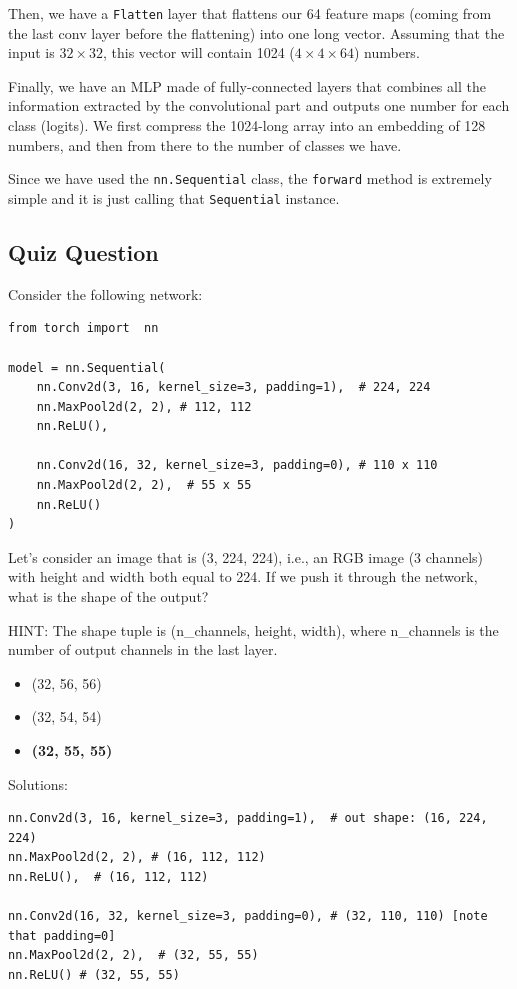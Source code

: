 Then, we have a \lstinline{Flatten} layer that flattens our 64 feature maps (coming from the last conv layer before the flattening) into one long vector. Assuming that the input is \(32 \times 32\), this vector will contain 1024 (\(4 \times 4 \times 64\)) numbers.\newline

Finally, we have an MLP made of fully-connected layers that combines all the information extracted by the convolutional part and outputs one number for each class (logits). We first compress the 1024-long array into an embedding of 128 numbers, and then from there to the number of classes we have.\newline

Since we have used the \lstinline{nn.Sequential} class, the \lstinline{forward} method is extremely simple and it is just calling that \lstinline{Sequential} instance.

\subsection{Quiz Question}

Consider the following network:
\begin{lstlisting}
from torch import  nn

model = nn.Sequential(
    nn.Conv2d(3, 16, kernel_size=3, padding=1),  # 224, 224
    nn.MaxPool2d(2, 2), # 112, 112
    nn.ReLU(),
    
    nn.Conv2d(16, 32, kernel_size=3, padding=0), # 110 x 110
    nn.MaxPool2d(2, 2),  # 55 x 55
    nn.ReLU()
)
\end{lstlisting}
Let's consider an image that is (3, 224, 224), i.e., an RGB image (3 channels) with height and width both equal to 224. If we push it through the network, what is the shape of the output?

HINT: The shape tuple is (n\_channels, height, width), where n\_channels is the number of output channels in the last layer.

\begin{itemize}
    \item (32, 56, 56)
    \item (32, 54, 54)
    \item \textbf{(32, 55, 55)}

\end{itemize}
Solutions: 
\begin{lstlisting}
nn.Conv2d(3, 16, kernel_size=3, padding=1),  # out shape: (16, 224, 224)
nn.MaxPool2d(2, 2), # (16, 112, 112)
nn.ReLU(),  # (16, 112, 112)
    
nn.Conv2d(16, 32, kernel_size=3, padding=0), # (32, 110, 110) [note that padding=0]
nn.MaxPool2d(2, 2),  # (32, 55, 55)
nn.ReLU() # (32, 55, 55)
\end{lstlisting}

